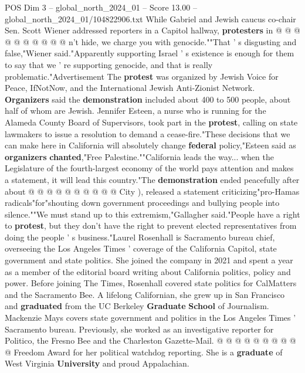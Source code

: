 \begin{textsample}{POS Dim 3 – global\_north\_2024\_01 – Score 13.00 – global\_north\_2024\_01/104822906.txt}
While Gabriel and Jewish caucus co-chair Sen.
Scott Wiener addressed reporters in a Capitol hallway, \textbf{protesters} in @ @ @ @ @ @ @ @ @ @ n't hide, we charge you with genocide.""That ' s disgusting and false,"Wiener said."Apparently supporting Israel ' s existence is enough for them to say that we ' re supporting genocide, and that is really problematic."Advertisement The \textbf{protest} was organized by Jewish Voice for Peace, IfNotNow, and the International Jewish Anti-Zionist Network. \textbf{Organizers} said the \textbf{demonstration} included about 400 to 500 people, about half of whom are Jewish.
Jennifer Esteen, a nurse who is running for the Alameda County Board of Supervisors, took part in the \textbf{protest}, calling on state lawmakers to issue a resolution to demand a cease-fire."These decisions that we can make here in California will absolutely change \textbf{federal} policy,"Esteen said as \textbf{organizers} \textbf{chanted},"Free Palestine.""California leads the way... when the Legislature of the fourth-largest economy of the world pays attention and makes a statement, it will lead this country."The \textbf{demonstration} ended peacefully after about @ @ @ @ @ @ @ @ @ @ City ), released a statement criticizing"pro-Hamas radicals"for"shouting down government proceedings and bullying people into silence.""We must stand up to this extremism,"Gallagher said."People have a right to \textbf{protest}, but they don't have the right to prevent elected representatives from doing the people ' s business."Laurel Rosenhall is Sacramento bureau chief, overseeing the Los Angeles Times ' coverage of the California Capitol, state government and state politics.
She joined the company in 2021 and spent a year as a member of the editorial board writing about California politics, policy and power.
Before joining The Times, Rosenhall covered state politics for CalMatters and the Sacramento Bee.
A lifelong Californian, she grew up in San Francisco and \textbf{graduated} from the UC Berkeley \textbf{Graduate} \textbf{School} of Journalism.
Mackenzie Mays covers state government and politics in the Los Angeles Times ' Sacramento bureau.
Previously, she worked as an investigative reporter for Politico, the Fresno Bee and the Charleston Gazette-Mail. @ @ @ @ @ @ @ @ @ @ Freedom Award for her political watchdog reporting.
She is a \textbf{graduate} of West Virginia \textbf{University} and proud Appalachian.

\end{textsample}
